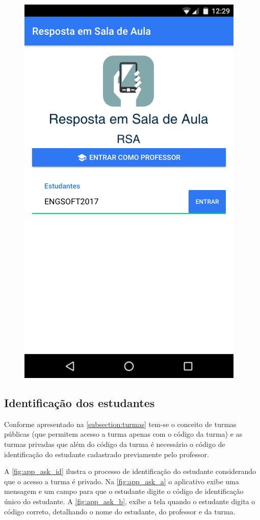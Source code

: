 \begin{figure}[h]
{    \includegraphics[scale=.4]{imagens/telas/app_home}
  }

  \doautor
  \label{fig:app_home}
\end{figure}


\subsection{Identificação dos estudantes}

Conforme apresentado na \autoref{subsection:turmas} tem-se o conceito
de turmas públicas (que permitem acesso a turma apenas com o código da turma) e
as turmas privadas que além do código da turma é necessário o código de identificação
do estudante cadastrado previamente pelo professor.

A \autoref{fig:app_ask_id} ilustra o processo de identificação do estudante
considerando que o acesso a turma é privado. Na \autoref{fig:app_ask_a} o aplicativo
exibe uma mensagem e um campo para que o estudante digite o código de
identificação único do estudante. A \autoref{fig:app_ask_b}, exibe a tela
quando o estudante digita o código correto, detalhando o nome do estudante, do professor e da turma.

